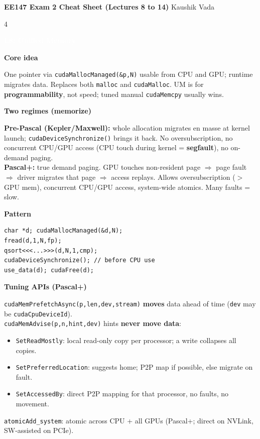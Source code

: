 \documentclass[10pt]{extarticle}
\newcommand{\sect}[1]{\vspace{3pt}\par\colorbox{hdr}{\textcolor{white}{\textbf{\small #1}}}\par\vspace{2pt}}
\newcommand{\sub}[1]{\vspace{2pt}\par\textbf{\footnotesize\textcolor{hdr}{#1}}\par}
\begin{document}
\footnotesize

\begin{center}
\textbf{EE147 Exam 2 Cheat Sheet (Lectures 8 to 14)} \textbullet{} Kaushik Vada
\end{center}
\vspace{-4pt}

\begin{multicols*}{4}

\sect{L8: Unified Memory}
\sub{Core idea}
One pointer via \texttt{cudaMallocManaged(\&p,N)} usable from CPU and GPU; runtime migrates data. Replaces both \texttt{malloc} and \texttt{cudaMalloc}. UM is for \textbf{programmability}, not speed; tuned manual \texttt{cudaMemcpy} usually wins.

\sub{Two regimes (memorize)}
\textbf{Pre-Pascal (Kepler/Maxwell):} whole allocation migrates en masse at kernel launch; \texttt{cudaDeviceSynchronize()} brings it back. No oversubscription, no concurrent CPU/GPU access (CPU touch during kernel = \textbf{segfault}), no on-demand paging.\\
\textbf{Pascal+:} true demand paging. GPU touches non-resident page $\Rightarrow$ page fault $\Rightarrow$ driver migrates that page $\Rightarrow$ access replays. Allows oversubscription ($>$GPU mem), concurrent CPU/GPU access, system-wide atomics. Many faults = slow.

\sub{Pattern}
\begin{lstlisting}
char *d; cudaMallocManaged(&d,N);
fread(d,1,N,fp);
qsort<<<...>>>(d,N,1,cmp);
cudaDeviceSynchronize(); // before CPU use
use_data(d); cudaFree(d);
\end{lstlisting}

\sub{Tuning APIs (Pascal+)}
\texttt{cudaMemPrefetchAsync(p,len,dev,stream)} \textbf{moves} data ahead of time (\texttt{dev} may be \texttt{cudaCpuDeviceId}).\\
\texttt{cudaMemAdvise(p,n,hint,dev)} hints \textbf{never move data}:
\begin{itemize}
\item \texttt{SetReadMostly}: local read-only copy per processor; a write collapses all copies.
\item \texttt{SetPreferredLocation}: suggests home; P2P map if possible, else migrate on fault.
\item \texttt{SetAccessedBy}: direct P2P mapping for that processor, no faults, no movement.
\end{itemize}
\texttt{atomicAdd\_system}: atomic across CPU + all GPUs (Pascal+; direct on NVLink, SW-assisted on PCIe).


\end{multicols*}
\end{document}
